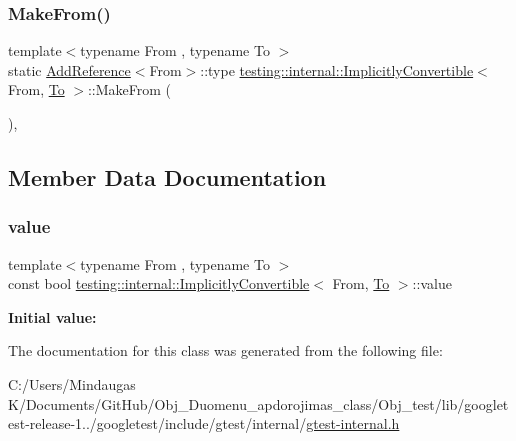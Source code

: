 \subsubsection{\texorpdfstring{MakeFrom()}{MakeFrom()}}
{\footnotesize\ttfamily template$<$typename From , typename To $>$ \\
static \mbox{\hyperlink{structtesting_1_1internal_1_1_add_reference}{Add\+Reference}}$<$From$>$\+::type \mbox{\hyperlink{classtesting_1_1internal_1_1_implicitly_convertible}{testing\+::internal\+::\+Implicitly\+Convertible}}$<$ From, \mbox{\hyperlink{classtesting_1_1internal_1_1_to}{To}} $>$\+::Make\+From (\begin{DoxyParamCaption}{ }\end{DoxyParamCaption})\hspace{0.3cm}{\ttfamily [static]}, {\ttfamily [private]}}



\subsection{Member Data Documentation}
\mbox{\label{classtesting_1_1internal_1_1_implicitly_convertible_aea51cecabca681fb75659e224771b7b7}} 
\subsubsection{\texorpdfstring{value}{value}}
{\footnotesize\ttfamily template$<$typename From , typename To $>$ \\
const bool \mbox{\hyperlink{classtesting_1_1internal_1_1_implicitly_convertible}{testing\+::internal\+::\+Implicitly\+Convertible}}$<$ From, \mbox{\hyperlink{classtesting_1_1internal_1_1_to}{To}} $>$\+::value\hspace{0.3cm}{\ttfamily [static]}}

{\bfseries Initial value\+:}
\begin{DoxyCode}{0}
\DoxyCodeLine{=}

\end{DoxyCode}


The documentation for this class was generated from the following file\+:\begin{DoxyCompactItemize}
\item 
C\+:/\+Users/\+Mindaugas K/\+Documents/\+Git\+Hub/\+Obj\+\_\+\+Duomenu\+\_\+apdorojimas\+\_\+class/\+Obj\+\_\+test/lib/googletest-\/release-\/1../googletest/include/gtest/internal/\mbox{\hyperlink{_obj__test_2lib_2googletest-release-1_88_81_2googletest_2include_2gtest_2internal_2gtest-internal_8h}{gtest-\/internal.\+h}}\end{DoxyCompactItemize}

